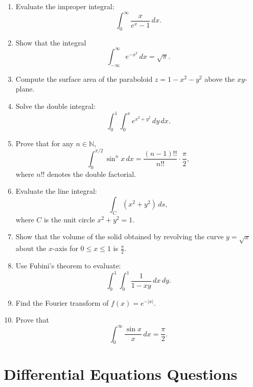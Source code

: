 \documentclass{article}
\begin{document}
\begin{enumerate}
    \item Evaluate the improper integral:
    \[
    \int_{0}^{\infty} \frac{x}{e^x - 1} \, dx.
    \]

    \item Show that the integral
    \[
    \int_{-\infty}^{\infty} e^{-x^2} \, dx = \sqrt{\pi}.
    \]

    \item Compute the surface area of the paraboloid \( z = 1 - x^2 - y^2 \) above the \( xy \)-plane.

    \item Solve the double integral:
    \[
    \int_{0}^{1} \int_{0}^{x} e^{x^2 + y^2} \, dy \, dx.
    \]

    \item Prove that for any \( n \in \mathbb{N} \),
    \[
    \int_{0}^{\pi/2} \sin^n x \, dx = \frac{(n-1)!!}{n!!} \cdot \frac{\pi}{2},
    \]
    where \( n!! \) denotes the double factorial.

    \item Evaluate the line integral:
    \[
    \int_{C} (x^2 + y^2) \, ds,
    \]
    where \( C \) is the unit circle \( x^2 + y^2 = 1 \).

    \item Show that the volume of the solid obtained by revolving the curve \( y = \sqrt{x} \) about the \( x \)-axis for \( 0 \leq x \leq 1 \) is \( \frac{\pi}{2} \).

    \item Use Fubini's theorem to evaluate:
    \[
    \int_{0}^{1} \int_{0}^{1} \frac{1}{1 - xy} \, dx \, dy.
    \]

    \item Find the Fourier transform of \( f(x) = e^{-|x|} \).

    \item Prove that
    \[
    \int_{0}^{\infty} \frac{\sin x}{x} \, dx = \frac{\pi}{2}.
    \]
\end{enumerate}

\section*{Differential Equations Questions}
\end{document}
